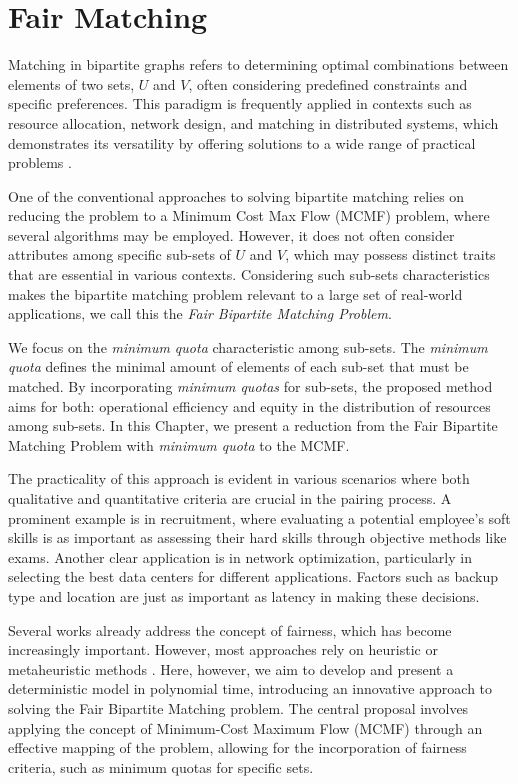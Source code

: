 \chapter{Fair Matching} \label{chap:fair_matching}
    
    Matching in bipartite graphs refers to determining optimal combinations between elements of two sets, $U$ and $V$, often considering predefined constraints and specific preferences. 
    This paradigm is frequently applied in contexts such as resource allocation, network design, and matching in distributed systems, which demonstrates its versatility by offering solutions to a wide range of practical problems \cite{karp1972reducibility}.
    
    One of the conventional approaches to solving bipartite matching relies on reducing the problem to a Minimum Cost Max Flow (MCMF) problem, where several algorithms may be employed.
    However, it does not often consider attributes among specific sub-sets of $U$ and $V$, which may possess distinct traits that are essential in various contexts.
    Considering such sub-sets characteristics makes the bipartite matching problem relevant to a large set of real-world applications, we call this the \emph{Fair Bipartite Matching Problem}.

    We focus on the \emph{minimum quota} characteristic among sub-sets.
    The \emph{minimum quota} defines the minimal amount of elements of each sub-set that must be matched.  %
    By incorporating \emph{minimum quotas} for sub-sets, the proposed method aims for both: operational efficiency and equity in the distribution of resources among sub-sets. 
    In this Chapter, we present a reduction from the Fair Bipartite Matching Problem with \emph{minimum quota} to the MCMF.

    The practicality of this approach is evident in various scenarios where both qualitative and quantitative criteria are crucial in the pairing process. 
    A prominent example is in recruitment, where evaluating a potential employee's soft skills is as important as assessing their hard skills through objective methods like exams. 
    Another clear application is in network optimization, particularly in selecting the best data centers for different applications. 
    Factors such as backup type and location are just as important as latency in making these decisions.
    
    Several works already address the concept of fairness, which has become increasingly important. However, most approaches rely on heuristic \cite{hatfield2005matching, rostami2018fairness, pappalardo2020algorithmic} or metaheuristic methods \cite{manlove2017algorithmics, yan2021metaheuristic, chapman2017matching}. Here, however, we aim to develop and present a deterministic model in polynomial time, introducing an innovative approach to solving the Fair Bipartite Matching problem. The central proposal involves applying the concept of Minimum-Cost Maximum Flow (MCMF) through an effective mapping of the problem, allowing for the incorporation of fairness criteria, such as minimum quotas for specific sets.

